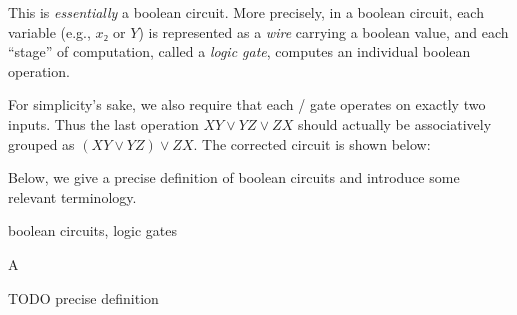 {  This is \emph{essentially} a boolean circuit.  More precisely, in a boolean
  circuit, each variable (e.g., \(x₂\) or \(Y\)) is represented as a \emph{wire}
  carrying a boolean value, and each ``stage'' of computation, called a
  \emph{logic gate}, computes an individual boolean operation.

  For simplicity's sake, we also require that each \AND/\OR{} gate operates on
  exactly two inputs.  Thus the last \OR{} operation \(XY∨YZ∨ZX\) should
  actually be associatively grouped as \((XY∨YZ)∨ZX\).  The corrected circuit
  is shown below:

  \begin{center}
  \end{center}

}


Below, we give a precise definition of boolean circuits and introduce some
relevant terminology.

\begin{definition}{boolean circuits, logic gates}{}

  A 

  TODO precise definition

\end{definition}


